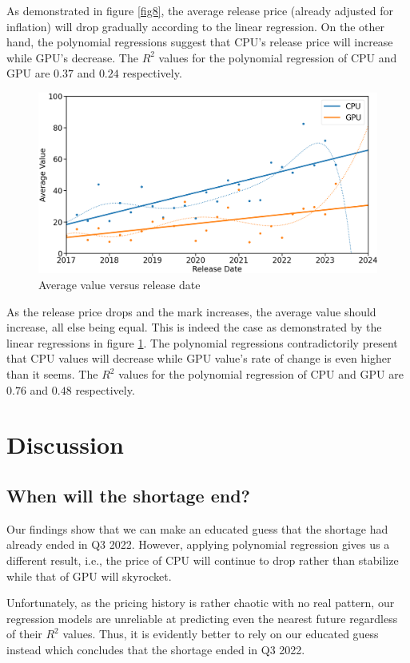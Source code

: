 \documentclass[conference]{IEEEtran}
\begin{document}
As demonstrated in figure \ref{fig8}, the average release price (already
adjusted for inflation) will drop gradually according to the linear regression.
On the other hand, the polynomial regressions suggest that CPU's release price
will increase while GPU's decrease. The $R^{2}$ values for the polynomial
regression of CPU and GPU are $0.37$ and $0.24$ respectively.

\begin{figure}[htbp]
	\centerline{\includegraphics[width=\columnwidth]{avg_value_reg.png}}
	\caption{Average value versus release date}
	\label{fig9}
\end{figure}

As the release price drops and the mark increases, the average value should
increase, all else being equal. This is indeed the case as demonstrated by
the linear regressions in figure \ref{fig9}. The polynomial regressions
contradictorily present that CPU values will decrease while GPU value’s rate
of change is even higher than it seems. The $R^{2}$ values for the polynomial
regression of CPU and GPU are $0.76$ and $0.48$ respectively.

\section{Discussion}
\subsection{When will the shortage end?}
Our findings show that we can make an educated guess that the shortage had
already ended in Q3 2022. However, applying polynomial regression gives us a
different result, i.e., the price of CPU will continue to drop rather than
stabilize while that of GPU will skyrocket.

Unfortunately, as the pricing history is rather chaotic with no real pattern,
our regression models are unreliable at predicting even the nearest future
regardless of their $R^{2}$ values. Thus, it is evidently better to rely
on our educated guess instead which concludes that the shortage ended in Q3
2022.
\end{document}
